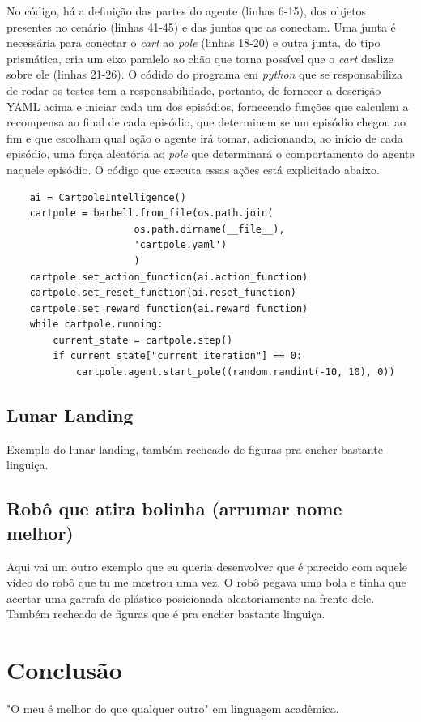 \documentclass[cic,tc]{iiufrgs}
\begin{document}
    No código, há a definição das partes do agente (linhas 6-15), dos objetos presentes no cenário (linhas 41-45) e das
    juntas que as conectam. Uma junta é necessária para conectar o \textit{cart} ao \textit{pole} (linhas 18-20) e outra
    junta, do tipo prismática, cria um eixo paralelo ao chão que torna possível que o \textit{cart} deslize sobre ele
    (linhas 21-26). O códido do programa em \textit{python} que se responsabiliza de rodar os testes tem a responsabilidade,
    portanto, de fornecer a descrição YAML acima e iniciar cada um dos episódios, fornecendo funções que calculem
    a recompensa ao final de cada episódio, que determinem se um episódio chegou ao fim e que escolham qual ação o agente irá
    tomar, adicionando, ao início de cada episódio, uma força aleatória ao \textit{pole} que determinará o
    comportamento do agente naquele episódio. O código que executa essas ações está explicitado abaixo.
    
    
    \begin{verbatim}
    ai = CartpoleIntelligence()
    cartpole = barbell.from_file(os.path.join(
                      os.path.dirname(__file__),
                      'cartpole.yaml')
                      )
    cartpole.set_action_function(ai.action_function)
    cartpole.set_reset_function(ai.reset_function)
    cartpole.set_reward_function(ai.reward_function)
    while cartpole.running:
        current_state = cartpole.step()
        if current_state["current_iteration"] == 0:
            cartpole.agent.start_pole((random.randint(-10, 10), 0))
    \end{verbatim}
    
    \section{Lunar Landing}
    Exemplo do lunar landing, também recheado de figuras pra encher bastante linguiça.
    \section{Robô que atira bolinha (arrumar nome melhor)}
    Aqui vai um outro exemplo que eu queria desenvolver que é parecido com aquele vídeo do robô que tu me mostrou uma vez.
    O robô pegava uma bola e tinha que acertar uma garrafa de plástico posicionada aleatoriamente na frente dele.
    Também recheado de figuras que é pra encher bastante linguiça.
    
    
    
    \chapter{Conclusão}
    "O meu é melhor do que qualquer outro" em linguagem acadêmica.
    
\end{document}

